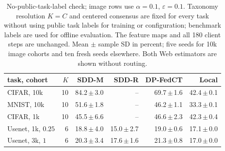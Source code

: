 \begin{table}[t]
\centering
\caption{No-public-task-label check; image rows use $\alpha=0.1$, $\varepsilon=0.1$. Taxonomy resolution $K=C$ and centered consensus are fixed for every task without using public task labels for training or configuration; benchmark labels are used for offline evaluation. The feature maps and all 180 client steps are unchanged. Mean $\pm$ sample SD in percent; five seeds for 10k image cohorts and ten fresh seeds elsewhere. Both Web estimators are shown without routing.}
\label{tab:label-free}
\small\setlength{\tabcolsep}{3pt}
\begin{tabular}{@{}lrrrrr@{}}\toprule
task, cohort & $K$ & SDD-M & SDD-R & DP-FedCT & Local \\\midrule
CIFAR, 10k & 10 & 84.2\,$\pm$\,3.0 & -- & 69.7\,$\pm$\,1.6 & 42.4\,$\pm$\,0.1 \\
MNIST, 10k & 10 & 51.6\,$\pm$\,1.8 & -- & 46.2\,$\pm$\,1.1 & 33.3\,$\pm$\,0.1 \\
CIFAR, 1k & 10 & 45.5\,$\pm$\,6.6 & -- & 46.6\,$\pm$\,2.3 & 42.3\,$\pm$\,0.4 \\
Usenet, 1k, $0.25$ & 6 & 18.8\,$\pm$\,4.0 & 15.0\,$\pm$\,2.7 & 19.0\,$\pm$\,0.6 & 17.1\,$\pm$\,0.0 \\
Usenet, 3k, $1$ & 6 & 20.3\,$\pm$\,3.4 & 17.6\,$\pm$\,1.6 & 21.3\,$\pm$\,0.8 & 17.0\,$\pm$\,0.0 \\
\bottomrule\end{tabular}
\end{table}
